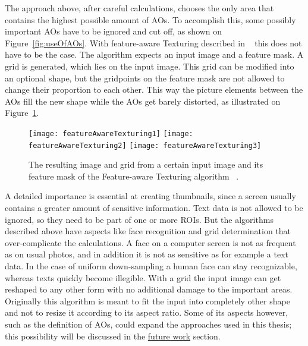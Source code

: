 \documentclass[draft,final]{vutinfth} %
\begin{document}
	The approach above, after careful calculations, chooses the only area that contains the highest possible amount of AOs.
	To accomplish this, some possibly important AOs have to be ignored and cut off, as shown on Figure~\ref{fig:useOfAOs}.
	With feature-aware Texturing described in ~\cite{gal2006feature} this does not have to be the case.
	The algorithm expects an input image and a feature mask.
	A grid is generated, which lies on the input image.
	This grid can be modified into an optional shape, but the gridpoints on the feature mask are not allowed to change their proportion to each other.
	This way the picture elements between the AOs fill the new shape while the AOs get barely distorted, as illustrated on Figure~\ref{fig:fat}.\par 
	\begin{figure}[h]
		\texttt{[image: featureAwareTexturing1]}\hfill
		\texttt{[image: featureAwareTexturing2]}\hfill
		\texttt{[image: featureAwareTexturing3]}
		\caption{The resulting image and grid from a certain input image and its feature mask of the Feature-aware Texturing algorithm ~\cite{gal2006feature}. }
		\label{fig:fat}
	\end{figure}
	A detailed importance is essential at creating thumbnails, since a screen usually contains a greater amount of sensitive information.
	Text data is not allowed to be ignored, so they need to be part of one or more ROIs.
	But the algorithms described above have aspects like face recognition and grid determination that over-complicate the calculations.
	A face on a computer screen is not as frequent as on usual photos, and in addition it is not as sensitive as for example a text data.
	In the case of uniform down-sampling a human face can stay recognizable, whereas texts quickly become illegible. 
	With a grid the input image can get reshaped to any other form with no additional damage to the important areas.
	Originally this algorithm is meant to fit the input into completely other shape and not to resize it according to its aspect ratio.
	Some of its aspects however, such as the definition of AOs, could expand the approaches used in this thesis; this possibility will be discussed in the \hyperref[futureWork]{future work} section.
	
\end{document}
